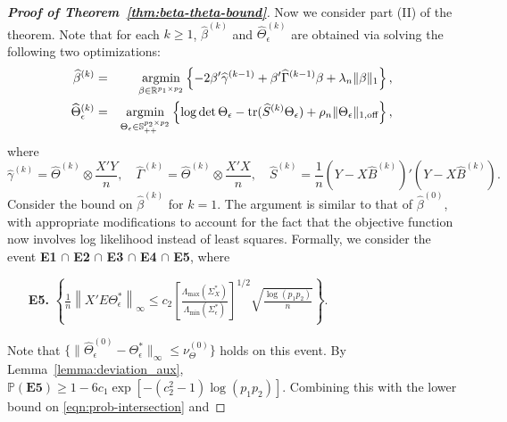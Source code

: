 \begin{proof}[\textbf{Proof of Theorem~\ref{thm:beta-theta-bound}}]
Now we consider part (II) of the theorem. Note that for each $k\geq 1$, $\widehat{\beta}^{(k)}$ and $\widehat{\Theta}_\epsilon^{(k)}$ are obtained via solving the following two optimizations: 
\begin{eqnarray}
\widehat{\beta}^{(k)} & =& \mathop{\text{argmin}}\limits_{\beta\in\mathbb{R}^{p_1\times p_2}} \left\{ -2\beta'\widehat{\gamma}^{(k-1)} + \beta'\widehat{\Gamma}^{(k-1)}\beta + \lambda_n\|\beta\|_1 \right\}, \\
\widehat{\Theta}_\epsilon^{(k)} & = & \mathop{\text{argmin}}\limits_{\Theta_\epsilon\in\mathbb{S}_{++}^{p_2\times p_2}}\left\{ \log\det \Theta_\epsilon - \text{tr}(\widehat{S}^{(k)} \Theta_\epsilon) + \rho_n\|\Theta_\epsilon\|_{1,\text{off}}  \right\},
\end{eqnarray}
where 
\begin{equation*}
\widehat{\gamma}^{(k)} = \widehat{\Theta}^{(k)}\otimes \frac{X'Y}{n}, \quad \widehat{\Gamma}^{(k)} = \widehat{\Theta}^{(k)}\otimes \frac{X'X}{n}, \quad \widehat{S}^{(k)} = \frac{1}{n}(Y-X\widehat{B}^{(k)})'(Y-X\widehat{B}^{(k)}).
\end{equation*}
Consider the bound on $\hat{\beta}^{(k)}$ for $k=1$. The argument is similar to that of $\hat{\beta}^{(0)}$, with appropriate modifications to account for the fact that the objective function now involves log likelihood instead of least squares. Formally, we consider the event \textbf{E1} $\cap$ \textbf{E2} $\cap$ \textbf{E3} $\cap$ \textbf{E4} $\cap$ \textbf{E5}, where 
\begin{itemize}
\item[\bf E5.] $\left\{\frac{1}{n}\left\| X'E\Theta^*_\epsilon\right\|_\infty \leq c_2\left[\frac{\Lambda_{\max}(\Sigma^*_X)}{\Lambda_{\min}(\Sigma^*_\epsilon)}\right]^{1/2} \sqrt{\frac{\log (p_1p_2) }{n}}\right\}$.
\end{itemize}
Note that $\{\|\widehat{\Theta}^{(0)}_\epsilon-\Theta^*_\epsilon\|_\infty\leq \nu_\Theta^{(0)}\}$ holds on this event.  By Lemma~\ref{lemma:deviation_aux}, $\mathbb{P}(\textbf{E5}) \geq 1- 6c_1\exp[-(c_2^2-1)\log(p_1p_2)]$. Combining this with the lower bound on \eqref{eqn:prob-intersection} and 

\end{proof}
